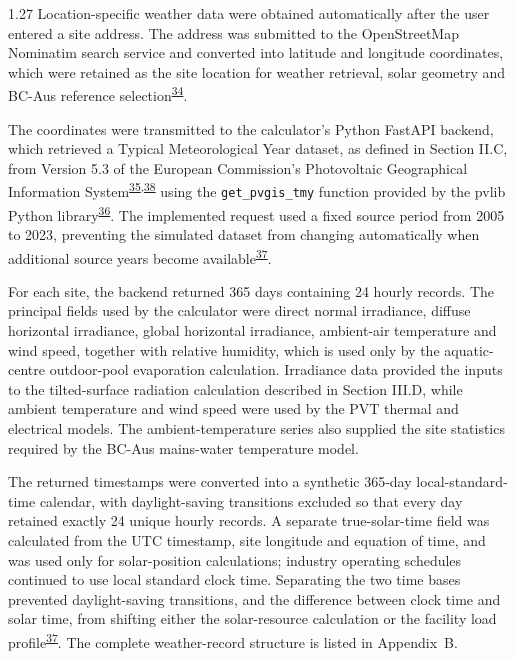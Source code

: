 \documentclass[12pt,letterpaper]{article}
\DeclareRobustCommand{\citenum}[1]{\hyperlink{ref:#1}{#1}} %
\begin{document}
\begin{spacing}{1.27}
Location-specific weather data were obtained automatically after the user entered a site address. The address was submitted to the OpenStreetMap Nominatim search service and converted into latitude and longitude coordinates, which were retained as the site location for weather retrieval, solar geometry and BC-Aus reference selection\textsuperscript{\citenum{34}}.\par

\vspace{0.15in}

The coordinates were transmitted to the calculator's Python FastAPI backend, which retrieved a Typical Meteorological Year dataset, as defined in Section II.C, from Version 5.3 of the European Commission's Photovoltaic Geographical Information System\textsuperscript{\citenum{35},\citenum{38}} using the \texttt{get\_pvgis\_tmy} function provided by the pvlib Python library\textsuperscript{\citenum{36}}. The implemented request used a fixed source period from 2005 to 2023, preventing the simulated dataset from changing automatically when additional source years become available\textsuperscript{\citenum{37}}.\par

\vspace{0.15in}

For each site, the backend returned 365 days containing 24 hourly records. The principal fields used by the calculator were direct normal irradiance, diffuse horizontal irradiance, global horizontal irradiance, ambient-air temperature and wind speed, together with relative humidity, which is used only by the aquatic-centre outdoor-pool evaporation calculation. Irradiance data provided the inputs to the tilted-surface radiation calculation described in Section III.D, while ambient temperature and wind speed were used by the PVT thermal and electrical models. The ambient-temperature series also supplied the site statistics required by the BC-Aus mains-water temperature model.\par

\vspace{0.15in}

The returned timestamps were converted into a synthetic 365-day local-standard-time calendar, with daylight-saving transitions excluded so that every day retained exactly 24 unique hourly records. A separate true-solar-time field was calculated from the UTC timestamp, site longitude and equation of time, and was used only for solar-position calculations; industry operating schedules continued to use local standard clock time. Separating the two time bases prevented daylight-saving transitions, and the difference between clock time and solar time, from shifting either the solar-resource calculation or the facility load profile\textsuperscript{\citenum{37}}. The complete weather-record structure is listed in Appendix~B.\par
\end{spacing}
\end{document}
